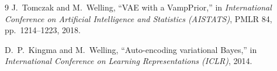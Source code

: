 \documentclass{dgm-homework}
\begin{document}
\maketitle
\tableofcontents




\begin{thebibliography}{9}
  J.~Tomczak and M.~Welling, ``VAE with a VampPrior,'' in \emph{International Conference on Artificial Intelligence and Statistics (AISTATS)}, PMLR 84, pp.~1214--1223, 2018.

  D.~P.~Kingma and M.~Welling, ``Auto-encoding variational Bayes,'' in \emph{International Conference on Learning Representations (ICLR)}, 2014.
\end{thebibliography}
\end{document}
